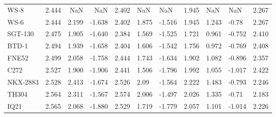 \begin{tabular}{lrrrllllllr}
          WS-8 &                  2.444 &                         NaN &                         NaN &                 2.402 &                        NaN &                        NaN &               1.945 &                      NaN &                      NaN & 2.267 \\
          WS-6 &                  2.444 &                       2.199 &                      -1.638 &                 2.402 &                      1.875 &                     -1.516 &               1.945 &                    1.243 &                    -0.78 & 2.267 \\
       SGT-130 &                  2.475 &                       1.905 &                      -1.640 &                 2.384 &                      1.569 &                     -1.525 &               1.721 &                    0.961 &                   -0.752 & 2.410 \\
         BTD-1 &                  2.494 &                       1.939 &                      -1.658 &                 2.404 &                      1.606 &                     -1.542 &               1.756 &                    0.972 &                   -0.769 & 2.408 \\
         FNE52 &                  2.499 &                       2.058 &                      -1.758 &                 2.444 &                      1.743 &                     -1.634 &               1.902 &                    1.082 &                   -0.896 & 2.357 \\
          C272 &                  2.527 &                       1.900 &                      -1.906 &                 2.441 &                      1.506 &                     -1.796 &               1.992 &                    1.055 &                   -1.017 & 2.422 \\
      NKX-2883 &                  2.528 &                       2.413 &                      -1.674 &                 2.526 &                       2.09 &                     -1.564 &               2.222 &                    1.483 &                   -0.793 & 2.246 \\
         TH304 &                  2.564 &                       2.311 &                      -1.567 &                 2.574 &                      2.006 &                     -1.497 &               2.026 &                    1.335 &                    -0.71 & 2.183 \\
          IQ21 &                  2.565 &                       2.068 &                      -1.880 &                 2.529 &                      1.719 &                     -1.779 &               2.057 &                    1.101 &                   -1.014 & 2.226 \\

\end{tabular}
